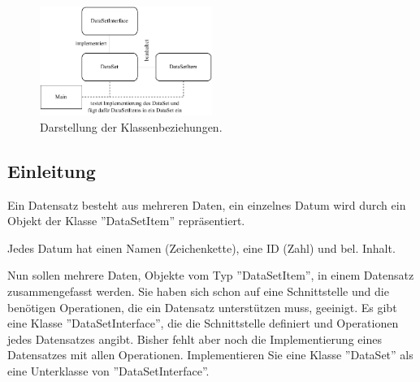 \documentclass[
    oneside, %
    12pt, %
    a4paper, %
    parskip=full %
]{scrartcl}
\begin{document}
\begin{figure}
    \centering
    \includegraphics[width = 0.5\textwidth]{./../diagram/classes_files.pdf}
    \caption{Darstellung der Klassenbeziehungen.}
\end{figure}

\subsection{Einleitung}

Ein Datensatz besteht aus mehreren Daten, ein einzelnes Datum wird durch ein Objekt der Klasse ''DataSetItem'' repräsentiert.

Jedes Datum hat einen Namen (Zeichenkette), eine ID (Zahl) und bel. Inhalt.


Nun sollen mehrere Daten, Objekte vom Typ ''DataSetItem'', in einem Datensatz zusammengefasst werden.
Sie haben sich schon auf eine Schnittstelle und die benötigen Operationen, die ein Datensatz unterstützen muss, geeinigt.
Es gibt eine Klasse ''DataSetInterface'', die die Schnittstelle definiert und Operationen jedes Datensatzes angibt.
Bisher fehlt aber noch die Implementierung eines Datensatzes mit allen Operationen.
Implementieren Sie eine Klasse ''DataSet'' als eine Unterklasse von ''DataSetInterface''.
\end{document}
